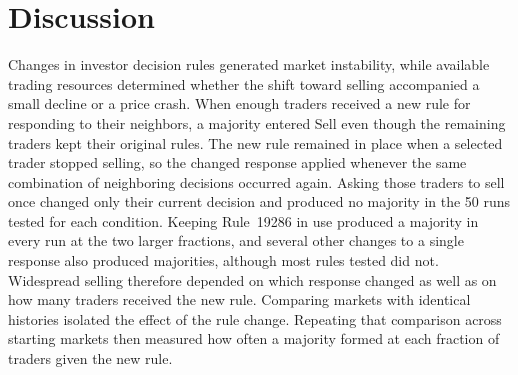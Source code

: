 \section{Discussion}

Changes in investor decision rules generated market instability, while
available trading resources determined whether the shift toward selling
accompanied a small decline or a price crash. When enough traders received a
new rule for responding to their neighbors, a majority entered Sell even
though the remaining traders kept their original rules. The new rule
remained in place when a selected trader stopped selling, so the changed
response applied whenever the same combination of neighboring decisions
occurred again. Asking those traders to sell once changed only their current
decision and produced no majority in the 50 runs tested for each condition.
Keeping Rule~19286 in use produced a majority in every run at the two larger
fractions, and several other changes to a single response also produced
majorities, although most rules tested did not. Widespread selling therefore
depended on which response changed as well as on how many traders received
the new rule. Comparing markets with identical histories isolated the effect
of the rule change. Repeating that comparison across starting markets then
measured how often a majority formed at each fraction of traders given the
new rule.

